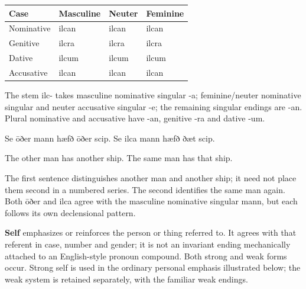 \par\begingroup
\fontsize{10.5}{13.2}\selectfont
\setlength{\LTleft}{0pt}\setlength{\LTright}{\fill}
\noindent
\begin{tabular}{@{}>{\raggedright\arraybackslash}p{28.89mm}>{\raggedright\arraybackslash}p{28.89mm}>{\raggedright\arraybackslash}p{28.89mm}>{\raggedright\arraybackslash}p{28.89mm}@{}}
\toprule
\textbf{Case} & \textbf{Masculine} & \textbf{Neuter} & \textbf{Feminine} \\
\midrule
Nominative & ilcan & ilcan & ilcan \\
Genitive & ilcra & ilcra & ilcra \\
Dative & ilcum & ilcum & ilcum \\
Accusative & ilcan & ilcan & ilcan \\
\bottomrule
\end{tabular}
\par\endgroup

The stem ilc- takes masculine nominative singular -a; feminine/\allowbreak{}neuter nominative singular and neuter accusative singular -e; the remaining singular endings are -an. Plural nominative and accusative have -an, genitive -ra and dative -um.

Se ōðer mann hæfð ōðer scip. Se ilca mann hæfð ðæt scip.

The other man has another ship. The same man has that ship.

The first sentence distinguishes another man and another ship; it need not place them second in a numbered series. The second identifies the same man again. Both ōðer and ilca agree with the masculine nominative singular mann, but each follows its own declensional pattern.

\textbf{Self} emphasizes or reinforces the person or thing referred to. It agrees with that referent in case, number and gender; it is not an invariant ending mechanically attached to an English-style pronoun compound. Both strong and weak forms occur. Strong self is used in the ordinary personal emphasis illustrated below; the weak system is retained separately, with the familiar weak endings.

